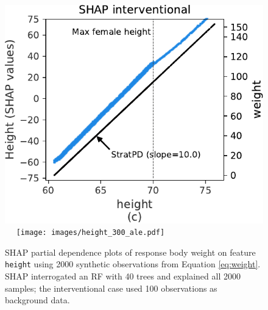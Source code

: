 \documentclass{article}
\begin{document}
\begin{figure}[htbp]
\begin{center}
\includegraphics[scale=0.35]{images/weight_interventional_shap.pdf}~~
\texttt{[image: images/height\_300\_ale.pdf]}~~
\caption{\small SHAP partial dependence plots of response body weight on feature {\tt height} using 2000 synthetic observations from Equation \eqref{eq:weight}. SHAP interrogated an RF with 40 trees and explained all 2000 samples; the interventional case used 100 observations as background data.}
\label{fig:heightweight}
\end{center}
\end{figure}
\end{document}
